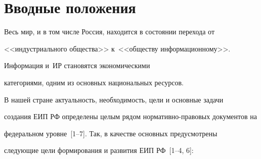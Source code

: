      \section{Вводные положения}



     Весь мир, и в том числе Россия, находится в состоянии перехода от

<<индустриального общества>> к~<<обществу информационному>>.

Информация и~ИР становятся экономическими

категориями, одним из основных национальных ресурсов.



     В нашей стране актуальность, необходимость, цели и основные задачи

создания ЕИП РФ определены целым рядом нор\-ма\-тив\-но-пра\-во\-вых документов на

федеральном уровне~[1--7]. Так, в качестве основных предусмотрены

следующие цели формирования и развития ЕИП РФ~[1--4, 6]:

